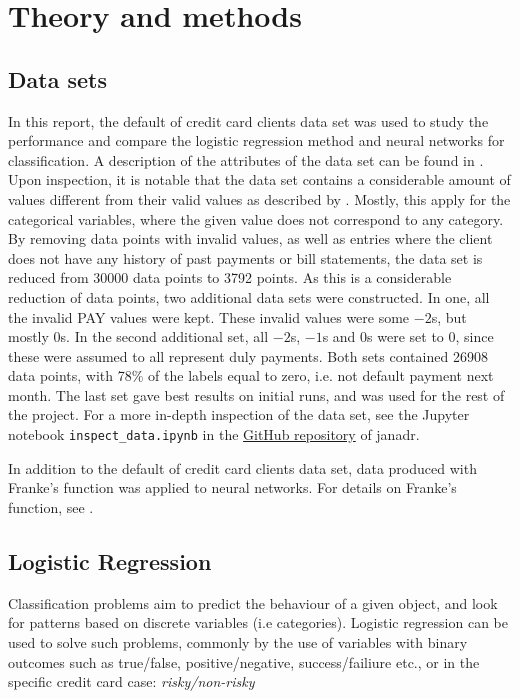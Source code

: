 \section{Theory and methods}
\label{sec:theory}

\subsection{Data sets}
\label{sec:datasets}
In this report, the default of credit card clients data set \citep{yeh2009UCI} was used to study the performance and compare the logistic regression method and neural networks for classification. A description of the attributes of the data set can be found in \cite{yeh2009UCI}. Upon inspection, it is notable that the data set contains a considerable amount of values different from their valid values as described by \citeauthor{yeh2009UCI}. Mostly, this apply for the categorical variables, where the given value does not correspond to any category. By removing data points with invalid values, as well as entries where the client does not have any history of past payments or bill statements, the data set is reduced from 30000 data points to 3792 points. As this is a considerable reduction of data points, two additional data sets were constructed. In one, all the invalid PAY values were kept. These invalid values were some $-2$s, but mostly $0$s. In the second additional set, all $-2$s, $-1$s and $0$s were set to $0$, since these were assumed to all represent duly payments. Both sets contained 26908 data points, with 78\% of the labels equal to zero, i.e. not default payment next month. The last set gave best results on initial runs, and was used for the rest of the project. For a more in-depth inspection of the data set, see the Jupyter notebook \texttt{inspect\_data.ipynb} in the \href{https://github.com/janadr/FYS-STK4155/tree/master/project2}{GitHub repository} of janadr.

In addition to the default of credit card clients data set, data produced with Franke's function was applied to neural networks. For details on Franke's function, see \cite{prosjekt1}.

\subsection{Logistic Regression}
Classification problems aim to predict the behaviour of a given object, and look for patterns based on discrete variables (i.e categories). Logistic regression can be used to solve such problems, commonly by the use of variables with binary outcomes such as true/false, positive/negative, success/failiure etc., or in the specific credit card case: \textit{risky/non-risky} \cite{LogRegLectures}

